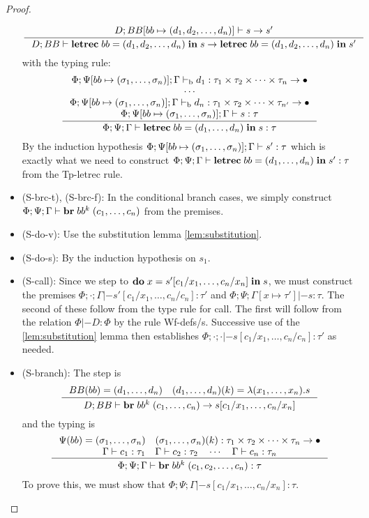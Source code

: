 \documentclass[a4paper, oneside, 10pt, draft]{memoir}
\begin{document}
\begin{proof}
\begin{itemize}
  \begin{equation*}
    \inference{D;BB[bb \mapsto \dbundle] |- s -> s'}
    {D;BB |- \iletrec{bb}{\dbundle}{s} -> \iletrec{bb}{\dbundle}{s'}}
  \end{equation*}
    with the typing rule:
        \begin{equation*}
          \inference{\Phi;\Psi[bb \mapsto \bbtypes];\Gamma \tpb
            d_1 : \ntypes -> \bullet\\
            \dotsb\\
            \Phi;\Psi[bb \mapsto \bbtypes];\Gamma \tpb d_n : \ntypespp
            -> \bullet\\
            \Phi;\Psi[bb \mapsto \bbtypes];\Gamma |- s : \tau}
          {\Phi;\Psi;\Gamma |- \iletrec{bb}{(d_1,
              \dotsc, d_n)}{s} : \tau}\\\\
    \end{equation*}
    By the induction hypothesis $\Phi;\Psi[bb \mapsto (\sigma_1, \dotsc, \sigma_n)];\Gamma
    |- s' : \tau$ which is exactly what we need to construct
    $\Phi;\Psi;\Gamma |- \mathbf{letrec} \; bb = (d_1, \dotsc, d_n) \; \mathbf{in} \; s' : \tau$
    from the Tp-letrec rule.
  \item (S-brc-t), (S-brc-f):
    In the conditional branch cases, we simply construct
    $\Phi;\Psi;\Gamma |- \mathbf{br} \; bb^k \; (c_1, \dotsc, c_n)$ from the
    premises.
  \item (S-do-v):
    Use the substitution lemma \eqref{lem:substitution}.
  \item (S-do-s):
    By the induction hypothesis on $s_1$.
  \item (S-call):
    Since we step to $\mathbf{do} \; x = s'[c_1/x_1,\dotsc,c_n/x_n] \; \mathbf{in} \; s$, we must
    construct the premises $\Phi;\cdot;\Gamma |-
    s'[c_1/x_1,\dotsc,c_n/c_n] : \tau'$ and $\Phi;\Psi;\Gamma[x
    \mapsto \tau'] |- s : \tau$. The second of these follow from the
    type rule for call. The first will follow from the relation $\Phi
    |- D : \Phi$ by the rule Wf-defs/s. Successive use of the
    \eqref{lem:substitution} lemma then establishes $\Phi;\cdot;\cdot
    |- s[c_1/x_1,\dotsc,c_n/c_n] : \tau'$ as needed.
  \item (S-branch):
    The step is
    \begin{equation*}
      \inference{BB(bb) = (d_1,\dotsc,d_n) \quad (d_1,\dotsc,d_n)(k) = \lambda(x_1, \dotsc,
        x_n).s}{D;BB |- \ibr{bb^k}{(c_1, \dotsc, c_n)} -> s[c_1/x_1, \dotsc, c_n/x_n]}
    \end{equation*}
    and the typing is
    \begin{equation*}
      \inference{\Psi(bb) = \bbtypes{} \quad \bbtypes{}(k) :
        \ntypes -> \bullet\\
        \Gamma |- c_1 : \tau_1 \quad \Gamma |- c_2 : \tau_2 \quad \dotsb
        \quad \Gamma |- c_n : \tau_n}
      {\Phi;\Psi;\Gamma |- \ibr{bb^k}(c_1, c_2, \dotsc, c_n) : \tau}
    \end{equation*}
    To prove this, we must show that $\Phi;\Psi;\Gamma |-
    s[c_1/x_1,\dotsc,c_n/x_n] : \tau$. 
  \end{itemize}
\end{proof}
\end{document}
